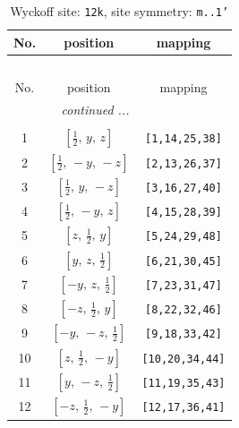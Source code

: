 \documentclass[fleqn,8pt]{jsarticle}
\begin{document}
\begin{longtable}{ccc}
\caption{Wyckoff site: {\tt 12k}, site symmetry: {\tt m..1'}}
 \\
 \hline \hline
No. & position & mapping \\ \hline \endfirsthead

\multicolumn{2}{l}{\tablename\ \thetable{}} \\
 \hline \hline
No. & position & mapping \\ \hline \endhead

 \hline \hline
\multicolumn{2}{r}{\footnotesize\it continued ...} \\ \endfoot

 \hline \hline
\multicolumn{2}{r}{} \\ \endlastfoot

1 & $\left[ \frac{1}{2},\, y,\, z \right]$ & {\tt [1,14,25,38]} \\ \hline
2 & $\left[ \frac{1}{2},\, - y,\, - z \right]$ & {\tt [2,13,26,37]} \\ \hline
3 & $\left[ \frac{1}{2},\, y,\, - z \right]$ & {\tt [3,16,27,40]} \\ \hline
4 & $\left[ \frac{1}{2},\, - y,\, z \right]$ & {\tt [4,15,28,39]} \\ \hline
5 & $\left[ z,\, \frac{1}{2},\, y \right]$ & {\tt [5,24,29,48]} \\ \hline
6 & $\left[ y,\, z,\, \frac{1}{2} \right]$ & {\tt [6,21,30,45]} \\ \hline
7 & $\left[ - y,\, z,\, \frac{1}{2} \right]$ & {\tt [7,23,31,47]} \\ \hline
8 & $\left[ - z,\, \frac{1}{2},\, y \right]$ & {\tt [8,22,32,46]} \\ \hline
9 & $\left[ - y,\, - z,\, \frac{1}{2} \right]$ & {\tt [9,18,33,42]} \\ \hline
10 & $\left[ z,\, \frac{1}{2},\, - y \right]$ & {\tt [10,20,34,44]} \\ \hline
11 & $\left[ y,\, - z,\, \frac{1}{2} \right]$ & {\tt [11,19,35,43]} \\ \hline
12 & $\left[ - z,\, \frac{1}{2},\, - y \right]$ & {\tt [12,17,36,41]} \\
\end{longtable}
\renewcommand{\arraystretch}{1.2}
\end{document}
